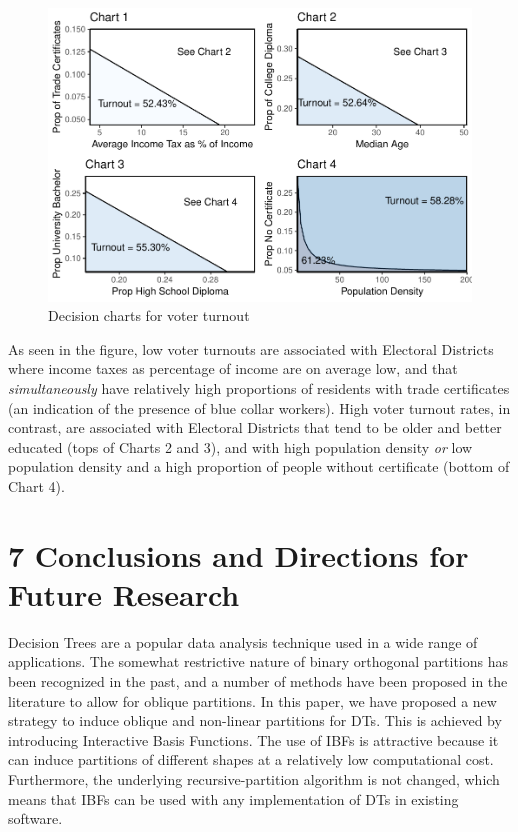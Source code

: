 \documentclass[]{elsarticle} %
\makeatletter
\def\maxwidth{\ifdim\Gin@nat@width>\linewidth\linewidth
\else\Gin@nat@width\fi}
\let\Oldincludegraphics\includegraphics
\renewcommand{\includegraphics}[1]{\Oldincludegraphics[width=\maxwidth]{#1}}
\makeatother
\begin{document}
\begin{figure}
\centering
\includegraphics{Trees_with_Base_Functions_v2_files/figure-latex/fig23-election-decision-charts-1.pdf}
\caption{\label{fig:fig23-election-decision-charts}Decision charts for
voter turnout}
\end{figure}

As seen in the figure, low voter turnouts are associated with Electoral
Districts where income taxes as percentage of income are on average low,
and that \emph{simultaneously} have relatively high proportions of
residents with trade certificates (an indication of the presence of blue
collar workers). High voter turnout rates, in contrast, are associated
with Electoral Districts that tend to be older and better educated (tops
of Charts 2 and 3), and with high population density \emph{or} low
population density and a high proportion of people without certificate
(bottom of Chart 4).

\section{7 Conclusions and Directions for Future
Research}\label{conclusions-and-directions-for-future-research}

Decision Trees are a popular data analysis technique used in a wide
range of applications. The somewhat restrictive nature of binary
orthogonal partitions has been recognized in the past, and a number of
methods have been proposed in the literature to allow for oblique
partitions. In this paper, we have proposed a new strategy to induce
oblique and non-linear partitions for DTs. This is achieved by
introducing Interactive Basis Functions. The use of IBFs is attractive
because it can induce partitions of different shapes at a relatively low
computational cost. Furthermore, the underlying recursive-partition
algorithm is not changed, which means that IBFs can be used with any
implementation of DTs in existing software.
\end{document}
